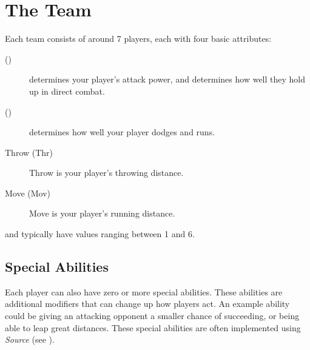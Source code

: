 \section{The Team} \label{the-team}
Each team consists of around 7 players, each with four basic attributes:

\begin{description}
    \item[\fight{} (\flt{})] \fight{} determines your player's attack power, and determines how well they hold up in direct combat.
    \item[\flight{} (\flt{})] \flight{} determines how well your player dodges and runs.
    \item[Throw (Thr)] Throw is your player's throwing distance.
    \item[Move (Mov)] Move is your player's running distance.
\end{description}

\fight{} and \flight{} typically have values ranging between 1 and 6.

\subsection{Special Abilities}
Each player can also have zero or more special abilities.
These abilities are additional modifiers that can change up how players act.
An example ability could be giving an attacking opponent a smaller chance of succeeding, or being able to leap great distances.
These special abilities are often implemented using \textit{Source} (see ).
